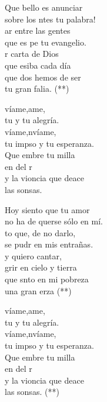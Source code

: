 \begin{cancion}%
	Que bello es anunciar \\
	sobre los ntes tu palabra!\\
	ar entre las gentes \\
	que es pe tu evangelio.\\
	r carta de Dios\\
	que esiba cada día\\
	que dos hemos de ser \\
	tu gran falia. (**)\jump\\
	\begin{chorus}%
		víame,ame, \\
		tu y tu alegría.\\
		víame,nvíame,\\
		tu impso y tu esperanza.\\
		Que embre tu milla\\
		en  del r\\
		y la vioncia que deace \\
		las sonsas.\jump\\
	\end{chorus}%
	\jump
Hoy siento que tu amor \\
	no ha de querse sólo en mí.\\
	to que, de no darlo,\\
	se pudr en mis entrañas.\\
	y quiero cantar,\\
	grir en cielo y tierra\\
	que snto en mi pobreza \\
	una gran erza (**)\jump\\
	\begin{chorus}%
		víame,ame, \\
		tu y tu alegría.\\
		víame,nvíame,\\
		tu impso y tu esperanza.\\
		Que embre tu milla\\
		en  del \chord{do}{m}{dolo}r\\
		y la vioncia que deace \\
		las sonsas. (**)\jump\\
	\end{chorus}%
	\jump
	\jump
\end{cancion}%
